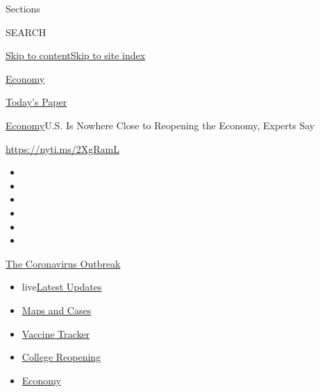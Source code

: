 Sections

SEARCH

\protect\hyperlink{site-content}{Skip to
content}\protect\hyperlink{site-index}{Skip to site index}

\href{https://www.nytimes.com/section/business/economy}{Economy}

\href{https://myaccount.nytimes.com/auth/login?response_type=cookie\&client_id=vi}{}

\href{https://www.nytimes.com/section/todayspaper}{Today's Paper}

\href{/section/business/economy}{Economy}\textbar{}U.S. Is Nowhere Close
to Reopening the Economy, Experts Say

\url{https://nyti.ms/2XgRamL}

\begin{itemize}
\item
\item
\item
\item
\item
\item
\end{itemize}

\href{https://www.nytimes.com/news-event/coronavirus?action=click\&pgtype=Article\&state=default\&region=TOP_BANNER\&context=storylines_menu}{The
Coronavirus Outbreak}

\begin{itemize}
\tightlist
\item
  live\href{https://www.nytimes.com/2020/08/04/world/coronavirus-covid-19.html?action=click\&pgtype=Article\&state=default\&region=TOP_BANNER\&context=storylines_menu}{Latest
  Updates}
\item
  \href{https://www.nytimes.com/interactive/2020/us/coronavirus-us-cases.html?action=click\&pgtype=Article\&state=default\&region=TOP_BANNER\&context=storylines_menu}{Maps
  and Cases}
\item
  \href{https://www.nytimes.com/interactive/2020/science/coronavirus-vaccine-tracker.html?action=click\&pgtype=Article\&state=default\&region=TOP_BANNER\&context=storylines_menu}{Vaccine
  Tracker}
\item
  \href{https://www.nytimes.com/2020/08/02/us/covid-college-reopening.html?action=click\&pgtype=Article\&state=default\&region=TOP_BANNER\&context=storylines_menu}{College
  Reopening}
\item
  \href{https://www.nytimes.com/live/2020/08/03/business/stock-market-today-coronavirus?action=click\&pgtype=Article\&state=default\&region=TOP_BANNER\&context=storylines_menu}{Economy}
\end{itemize}

